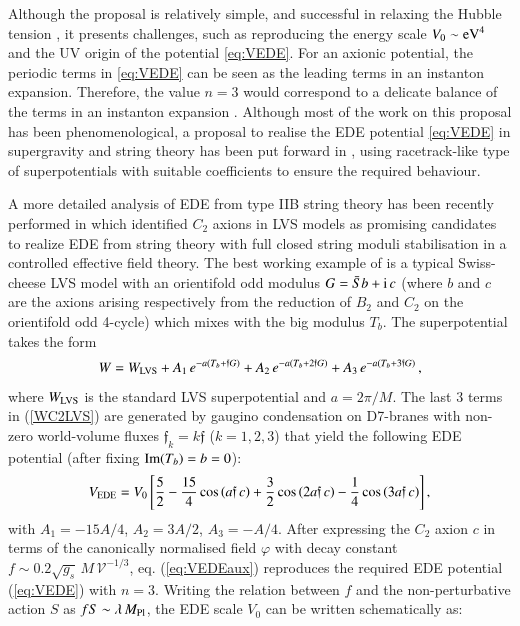 Although the proposal is relatively simple, and successful in relaxing the Hubble tension \cite{Schoneberg:2021qvd}, it presents challenges, such as reproducing the energy scale $V_0\sim {\rm eV}^4$ and the UV origin of the potential \eqref{eq:VEDE}. For an axionic potential, the periodic terms in \eqref{eq:VEDE} can be seen as the leading terms in an instanton expansion. Therefore, the value $n=3$ would correspond to a delicate balance of the terms in an instanton expansion \cite{Rudelius:2022gyu}. Although most of the work on this proposal has been phenomenological, a proposal to realise the EDE potential \eqref{eq:VEDE} in supergravity and string theory has been put forward in \cite{McDonough:2022pku}, using racetrack-like type of superpotentials with suitable coefficients to ensure the required behaviour. 

A more detailed analysis of EDE from type IIB string theory has been recently performed in \cite{Cicoli:2023qri} which identified $C_2$ axions in LVS models as promising candidates to realize EDE from string theory with full closed string moduli stabilisation in a controlled effective field theory. The best working example of \cite{Cicoli:2023qri} is a typical Swiss-cheese LVS model with an orientifold odd modulus $G=\bar{S} b+{\rm i}\,c$ (where $b$ and $c$ are the axions arising respectively from the reduction of $B_2$ and $C_2$ on the orientifold odd 4-cycle) which mixes with the big modulus $T_b$. The superpotential takes the form
\begin{equation}
W = W_{\rm LVS }+A_1\, e^{-a (T_b+\mathfrak{f} G)}+A_2\, e^{-a(T_b+2 \mathfrak{f} G)}+A_3\, e^{-a (T_b+3 \mathfrak{f} G)}\,,
\label{WC2LVS}
\end{equation}
where $W_{\rm LVS}$ is the standard LVS superpotential and $a=2\pi/M$. The last 3 terms in (\ref{WC2LVS}) are generated by gaugino condensation on D7-branes with non-zero world-volume fluxes $\mathfrak{f}_k=k \mathfrak{f}$ ($k=1,2,3$) that yield the following EDE potential (after fixing ${\rm Im}(T_b)=b=0$):
\begin{equation}
V_{\rm EDE}= V_0\left[\frac52 -\frac{15}{4}  \cos\left(a \mathfrak{f}\, c \right)+ \frac32 \cos\left(2 a \mathfrak{f}\, c \right)
- \frac14 \cos\left(3a\mathfrak{f}\, c \right) \right],
\label{eq:VEDEaux}
\end{equation}
with $A_1 = -15 A/4$, $A_2 = 3A/2$, $A_3=-A/4$. After expressing the $C_2$ axion $c$ in terms of the canonically normalised field $\varphi$ with decay constant $f\sim 0.2 \sqrt{g_s}\,M\,\mathcal{V}^{-1/3}$, eq. (\ref{eq:VEDEaux}) reproduces the required EDE potential (\ref{eq:VEDE}) with $n=3$. Writing the relation between $f$ and the non-perturbative action $S$ as $f S\sim \lambda\,M_{\rm Pl}$, the EDE scale $V_0$ can be written schematically as:
